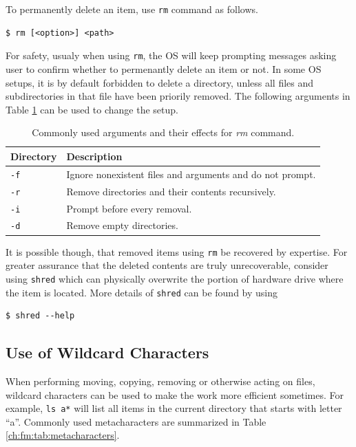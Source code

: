 To permanently delete an item, use \verb|rm| command as follows.
\begin{lstlisting}
$ rm [<option>] <path>
\end{lstlisting}
For safety, usualy when using \verb|rm|, the OS will keep prompting messages asking user to confirm whether to permenantly delete an item or not. In some OS setups, it is by default forbidden to delete a directory, unless all files and subdirectories in that file have been priorily removed. The following arguments in Table \ref{ch:fm:tab:rmcommandargument} can be used to change the setup.

\begin{table}
  \centering \caption{Commonly used arguments and their effects for \textit{rm} command.}\label{ch:fm:tab:rmcommandargument}
  \begin{tabularx}{\textwidth}{lX}
    \hline
    Directory & Description \\ \hline
    \verb|-f| & Ignore nonexistent files and arguments and do not prompt. \\ \hdashline
    \verb|-r| & Remove directories and their contents recursively. \\ \hdashline
    \verb|-i| & Prompt before every removal. \\ \hdashline
    \verb|-d| & Remove empty directories. \\
    \hline
  \end{tabularx}
\end{table}

It is possible though, that removed items using \verb|rm| be recovered by expertise. For greater assurance that the deleted contents are truly unrecoverable, consider using \verb|shred| which can physically overwrite the portion of hardware drive where the item is located. More details of \verb|shred| can be found by using
\begin{lstlisting}
$ shred --help
\end{lstlisting}

\subsection{Use of Wildcard Characters}

When performing moving, copying, removing or otherwise acting on files, wildcard characters can be used to make the work more efficient sometimes. For example, \verb|ls a*| will list all items in the current directory that starts with letter ``a''. Commonly used metacharacters are summarized in Table \ref{ch:fm:tab:metacharacters}.

